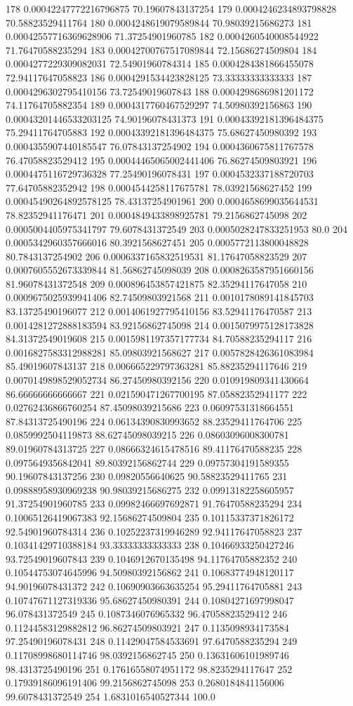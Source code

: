 {178 0.00042247772216796875 70.19607843137254
179 0.0004246234893798828 70.58823529411764
180 0.0004248619079589844 70.98039215686273
181 0.00042557716369628906 71.37254901960785
182 0.0004260540008544922 71.76470588235294
183 0.00042700767517089844 72.15686274509804
184 0.0004277229309082031 72.54901960784314
185 0.0004284381866455078 72.94117647058823
186 0.0004291534423828125 73.33333333333333
187 0.0004296302795410156 73.72549019607843
188 0.0004298686981201172 74.11764705882354
189 0.0004317760467529297 74.50980392156863
190 0.00043201446533203125 74.90196078431373
191 0.00043392181396484375 75.29411764705883
192 0.00043392181396484375 75.68627450980392
193 0.0004355907440185547 76.07843137254902
194 0.0004360675811767578 76.47058823529412
195 0.00044465065002441406 76.86274509803921
196 0.0004475116729736328 77.25490196078431
197 0.0004532337188720703 77.64705882352942
198 0.0004544258117675781 78.03921568627452
199 0.00045490264892578125 78.43137254901961
200 0.0004658699035644531 78.82352941176471
201 0.0004849433898925781 79.2156862745098
202 0.0005004405975341797 79.6078431372549
203 0.0005028247833251953 80.0
204 0.0005342960357666016 80.3921568627451
205 0.0005772113800048828 80.7843137254902
206 0.0006337165832519531 81.17647058823529
207 0.0007605552673339844 81.56862745098039
208 0.0008263587951660156 81.96078431372548
209 0.000896453857421875 82.35294117647058
210 0.0009675025939941406 82.74509803921568
211 0.0010178089141845703 83.13725490196077
212 0.0014061927795410156 83.52941176470587
213 0.0014281272888183594 83.92156862745098
214 0.0015079975128173828 84.31372549019608
215 0.0015981197357177734 84.70588235294117
216 0.0016827583312988281 85.09803921568627
217 0.0057828426361083984 85.49019607843137
218 0.006665229797363281 85.88235294117646
219 0.0070149898529052734 86.27450980392156
220 0.010919809341430664 86.66666666666667
221 0.021590471267700195 87.05882352941177
222 0.02762436866760254 87.45098039215686
223 0.06097531318664551 87.84313725490196
224 0.06134390830993652 88.23529411764706
225 0.0859992504119873 88.62745098039215
226 0.08603096008300781 89.01960784313725
227 0.08666324615478516 89.41176470588235
228 0.0975649356842041 89.80392156862744
229 0.09757304191589355 90.19607843137256
230 0.09820556640625 90.58823529411765
231 0.09888958930969238 90.98039215686275
232 0.09913182258605957 91.37254901960785
233 0.09982466697692871 91.76470588235294
234 0.10065126419067383 92.15686274509804
235 0.10115337371826172 92.54901960784314
236 0.10252237319946289 92.94117647058823
237 0.10341429710388184 93.33333333333333
238 0.10466933250427246 93.72549019607843
239 0.1046912670135498 94.11764705882352
240 0.10544753074645996 94.50980392156862
241 0.10683774948120117 94.90196078431372
242 0.10690903663635254 95.29411764705881
243 0.10747671127319336 95.68627450980391
244 0.10804271697998047 96.078431372549
245 0.1087346076965332 96.47058823529412
246 0.11244583129882812 96.86274509803921
247 0.1135098934173584 97.25490196078431
248 0.11429047584533691 97.6470588235294
249 0.11708998680114746 98.0392156862745
250 0.13631606101989746 98.4313725490196
251 0.17616558074951172 98.8235294117647
252 0.17939186096191406 99.2156862745098
253 0.2680184841156006 99.6078431372549
254 1.6831016540527344 100.0
}\tableexpivecdfrlactcripga
